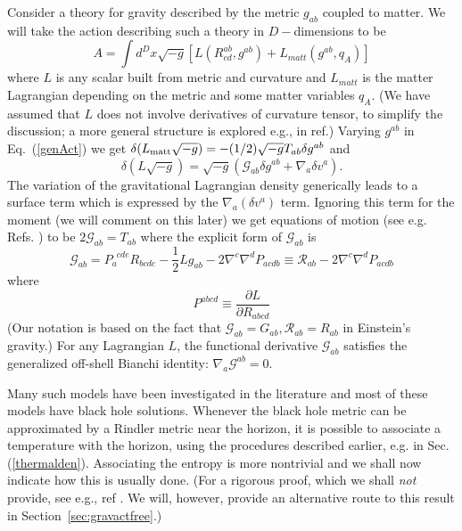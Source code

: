\documentclass[12pt]{iopart}
\def\eq#1{{Eq.~(\ref{#1})}}
\begin{document}
Consider a theory for gravity described by the metric $g_{ab}$ coupled to matter. We will take the action describing such a theory in $D-$dimensions to be
\begin{equation}
A=\int d^Dx \sqrt{-g}\left[L(R^{ab}_{cd}, g^{ab})+L_{matt}(g^{ab},q_A)\right]
\label{genAct}
\end{equation}  
where $ L$ is any scalar built from metric and curvature  and $L_{matt}$ is the matter Lagrangian depending on the metric and some matter variables $q_A$. (We have assumed that   $L$ does not involve derivatives of curvature tensor, to simplify the discussion; a more general structure is explored e.g., in ref.\cite{derofR}) Varying $g^{ab}$ in \eq{genAct} we get $\delta (L_{\rm matt} \sqrt{-g}) = - (1/2) \sqrt{-g} T_{ab} \delta g^{ab}$ and
 \begin{equation}
\delta(L\sqrt{-g }) =\sqrt{-g }\left( \mathcal{G}_{ab} \delta g^{ab} + \nabla_{a}\delta v^a\right). \label{variationL} 
\end{equation}
The variation of the gravitational Lagrangian
density generically leads to a surface term  which is   expressed 
by the $\nabla_a (\delta v^a) $ term. Ignoring this term for the moment (we will comment on this later) we get equations of motion (see e.g. Refs. \cite{ayan,mohut}) to be  $2\mathcal{G}_{ab}=T_{ab}$ where the explicit form of  $\mathcal{G}_{ab}$ is 
\begin{equation}
\mathcal{G}_{ab}=P_a^{\phantom{a} cde} R_{bcde}- \frac{1}{2} L g_{ab} - 2 \nabla^c \nabla^d P_{acdb} 
\equiv \mathcal{R}_{ab}-2 \nabla^c \nabla^d P_{acdb}
\label{genEab}
\end{equation}
where
\begin{equation}
P^{abcd} \equiv \frac{\partial L}{\partial R_{abcd}}
\end{equation}
(Our notation is based on the fact that $\mathcal{G}_{ab}=G_{ab},\mathcal{R}_{ab}=R_{ab}$ in Einstein's gravity.)
For any Lagrangian $L$, the functional
derivative $\mathcal{G}_{ab}$ satisfies the generalized off-shell Bianchi identity:
$
\nabla_a \mathcal{G}^{ab} = 0. 
$


Many such models have been investigated in the literature and  most of these models  have  black hole solutions. Whenever the black hole metric can be approximated by a Rindler metric near the horizon, it is possible to associate a temperature with the horizon, using the procedures described earlier, e.g. in Sec.(\ref{thermalden}). Associating the entropy is more nontrivial and we shall now indicate how this is usually done.
(For a rigorous proof, which we shall \textit{not} provide, see e.g., ref \cite{Wald:1993nt}. We will, however, provide an alternative route to this result in Section~\ref{sec:gravactfree}.)
\end{document}
